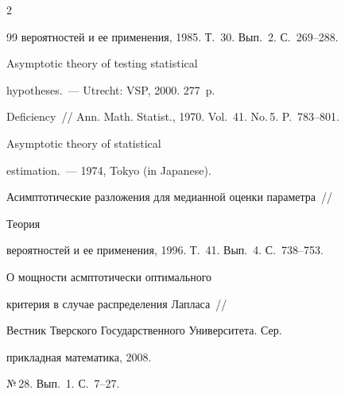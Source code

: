 \begin{multicols}{2}
{{\begin{thebibliography}{99}
вероятностей и ее применения, 1985. Т.~30. Вып.~2. С.~269--288.









Asymptotic theory of testing statistical


hypotheses.~---  Utrecht: VSP, 2000. 277~p.









Deficiency~// Ann. Math. Statist., 1970. Vol.~41. No.\,5. P.~783--801.









Asymptotic theory of statistical


estimation.~--- 1974, Tokyo (in Japanese).









 Асимптотические разложения для медианной оценки параметра~//


Теория


вероятностей и ее применения, 1996. Т.~41. Вып.~4. С.~738--753.





\label{end\stat}









О мощности асмптотически оптимального


критерия в случае распределения Лапласа~//


Вестник Тверского  Государственного Университета.  Сер.\


прикладная математика, 2008.


№\,28. Вып.~1. С.~7--27.




















\end{thebibliography}





} 


}


\end{multicols}


